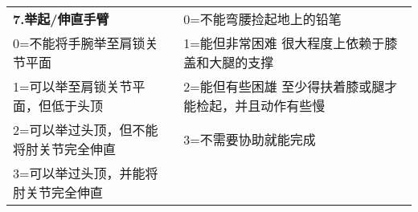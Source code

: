 \begin{table}[h]
\begin{tabular}{|p{}||p{}|}
\textbf{7.举起/伸直手臂}     & 0=不能弯腰捡起地上的铅笔    \\ \cline{1-1}
0=不能将手腕举至肩锁关节平面            & 1=能但非常困难   很大程度上依赖于膝盖和大腿的支撑\\
1=可以举至肩锁关节平面，但低于头顶         & 2=能但有些困雄   至少得扶着膝或腿才能检起，并且动作有些慢\\
2=可以举过头顶，但不能将肘关节完全伸直       & 3=不需要协助就能完成                \\
3=可以举过头顶，并能将肘关节完全伸直        &       \\ \hline
\end{tabular}
\end{table}
